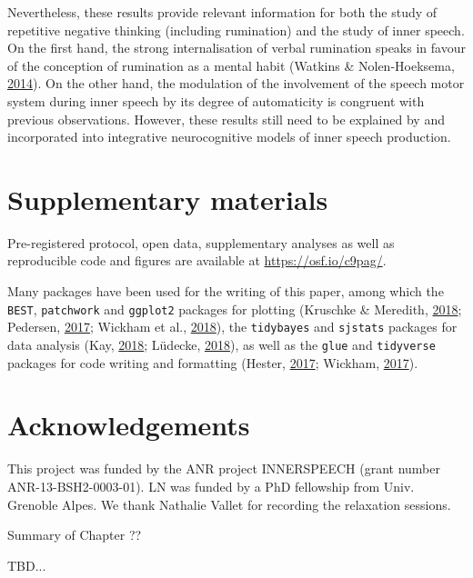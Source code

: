 \documentclass[a4paper,12pt,twoside,openright,oldfontcommands]{memoir}
\newcommand\getcurrentref[1]{
 \ifnumequal{\value{#1}}{0}
  {??}
  {\the\value{#1}}
}
\begin{document}
Nevertheless, these results provide relevant information for both the study of repetitive negative thinking (including rumination) and the study of inner speech. On the first hand, the strong internalisation of verbal rumination speaks in favour of the conception of rumination as a mental habit (Watkins \& Nolen-Hoeksema, \protect\hyperlink{ref-watkins_habit-goal_2014}{2014}). On the other hand, the modulation of the involvement of the speech motor system during inner speech by its degree of automaticity is congruent with previous observations. However, these results still need to be explained by and incorporated into integrative neurocognitive models of inner speech production.

\hypertarget{suppCh4}{%
\section{Supplementary materials}\label{suppCh4}}

Pre-registered protocol, open data, supplementary analyses as well as reproducible code and figures are available at \url{https://osf.io/c9pag/}.

Many packages have been used for the writing of this paper, among which the \texttt{BEST}, \texttt{patchwork} and \texttt{ggplot2} packages for plotting (Kruschke \& Meredith, \protect\hyperlink{ref-R-BEST}{2018}; Pedersen, \protect\hyperlink{ref-R-patchwork}{2017}; Wickham et al., \protect\hyperlink{ref-R-ggplot2}{2018}), the \texttt{tidybayes} and \texttt{sjstats} packages for data analysis (Kay, \protect\hyperlink{ref-R-tidybayes}{2018}; Lüdecke, \protect\hyperlink{ref-R-sjstats}{2018}), as well as the \texttt{glue} and \texttt{tidyverse} packages for code writing and formatting (Hester, \protect\hyperlink{ref-R-glue}{2017}; Wickham, \protect\hyperlink{ref-R-tidyverse}{2017}).

\hypertarget{acknowledgements-1}{%
\section{Acknowledgements}\label{acknowledgements-1}}

This project was funded by the ANR project INNERSPEECH (grant number ANR-13-BSH2-0003-01). LN was funded by a PhD fellowship from Univ. Grenoble Alpes. We thank Nathalie Vallet for recording the relaxation sessions.

\newpage

\begin{vplace}[1]

\begin{summary}{Summary of Chapter\getcurrentref{chapter}}

TBD...

\end{summary}

\end{vplace}
\end{document}
